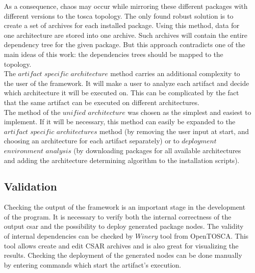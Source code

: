 As a consequence, chaos may occur while  mirroring these different packages with different versions to the \gls{tosca} topology.
The only found robust solution is to create a set of archives for each installed package. Using this method, data for one architecture are stored into one archive.
Such archives will contain the entire dependency tree for the given package.
But this approach contradicts one of the main ideas of this work: the dependencies trees should be mapped to the topology.\\
The $artifact$ $specific$ $architecture$ method carries an additional complexity to the user of the framework.
It will make a user to analyze each artifact and decide which architecture it will be executed on. 
This can be complicated by the fact that the same artifact can be executed on different architectures.\\
The method of the $unified$ $architecture$ was chosen as the simplest and easiest to implement.
If it will be necessary, this method can easily be expanded to the $artifact$ $specific$ $architectures$ method (by removing the user input at start, and choosing an architecture for each artifact separately) or to $deployment$ $environment$ $analysis$ (by downloading packages for all available architectures and adding the architecture determining algorithm to the installation scripts).

%

\subsection{Validation}
Checking the output of the framework is an important stage in the development of the program.
It is necessary to verify both the internal correctness of the output \gls{csar} and the possibility to deploy generated package nodes.
The validity of internal dependencies can be checked by $Winery$ tool from OpenTOSCA.
This tool allows create and edit CSAR archives and is also great for visualizing the results.
Checking the deployment of the generated nodes can be done manually by entering commands which start the artifact's execution.


